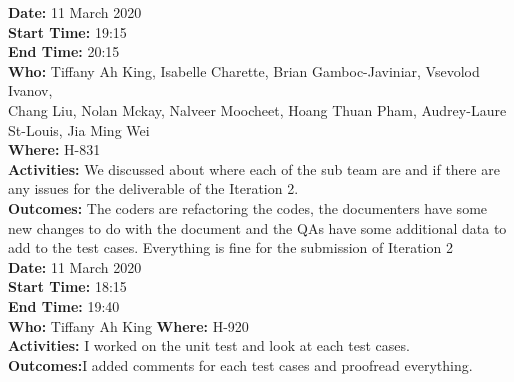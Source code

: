 \documentclass[12pt]{article}
\begin{document}
{\bf Date:} 11 March 2020\\
{\bf Start Time:} 19:15\\
{\bf End Time:} 20:15 \\
{\bf Who:} Tiffany Ah King, Isabelle Charette, Brian Gamboc-Javiniar, Vsevolod Ivanov,\\
Chang Liu, Nolan Mckay, Nalveer Moocheet, Hoang Thuan Pham, Audrey-Laure St-Louis, Jia Ming Wei\\
{\bf Where:} H-831\\
{\bf Activities:} We discussed about where each of the sub team are and if there are any issues for the deliverable of the Iteration 2.\\
{\bf Outcomes:} The coders are refactoring the codes, the documenters have some new changes to do with the document and the QAs have some additional data to add to the test cases. Everything is fine for the submission of Iteration 2\\

{\bf Date:} 11 March 2020\\
{\bf Start Time:} 18:15 \\
{\bf End Time:} 19:40\\
{\bf Who:} Tiffany Ah King
{\bf Where:} H-920\\
{\bf Activities:} I worked on the unit test and look at each test cases. \\
{\bf Outcomes:}I added comments for each test cases and proofread everything.\\

\end{document}
